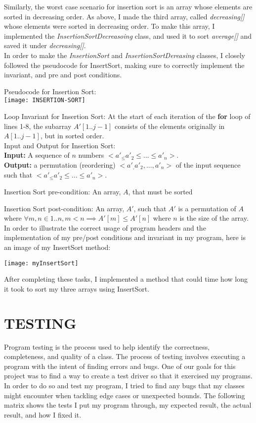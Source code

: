 \documentclass[12pt]{article}
\begin{document}
Similarly, the worst case scenario for insertion sort is an array whose elements are sorted in decreasing order. As above, I made the third array, called \textit{decreasing[]} whose elements were sorted in decreasing order. To make this array, I implemented the \textit{InsertionSortDecreasoing} class, and used it to sort \textit{average[]} and saved it under \textit{decreasing[]}.\\

In order to make the \textit{InsertionSort} and \textit{InsertionSortDereasing} classes, I closely followed the pseudocode for InsertSort, making sure to correctly implement the invariant, and pre and post conditions.

\vspace*{.2in}
Pseudocode for Insertion Sort: \\
\vspace*{.5in}
\texttt{[image: INSERTION-SORT]}

Loop Invariant for Insertion Sort: At the start of each iteration of the \textbf{for} loop of lines 1-8, the subarray $A'[1 .. j-1]$ consists of the elements originally in $A[1 .. j-1]$, but in  sorted order.\\

Input and Output for Insertion Sort:\\ \textbf{Input: } A sequence of $n$ numbers $<a'_ \le a'_2 \le ... \le a'_n>$. \\
\textbf{Output: } a permutation (reordering) $<a'_, a'_2, ... , a'_n>$ of the input sequence such that $<a'_ \le a'_2 \le ... \le a'_n>$.

Insertion Sort pre-condition: An array, $A$, that must be sorted

Insertion Sort post-condition: An array, $A'$, such that $A'$ is a permutation of $A$ where $\forall m, n \in {1..n}, m < n \implies A'[m] \le A'[n]$ where $n$ is the size of the array.\\

In order to illustrate the correct usage of program headers and the implementation of my pre/post conditions and invariant in my program, here is an image of my InsertSort method: 

\texttt{[image: myInsertSort]}

After completing these tasks, I implemented a method that could time how long it took to sort my three arrays using InsertSort. 



\section*{TESTING}
Program testing is the process used to help identify the correctness, completeness, and quality of a class. The process of testing involves executing a program with the intent of finding errors and bugs. One of our goals for this project was to find a way to create a test driver so that it exercised my programs. In order to do so and test my program, I tried to find any bugs that my classes might encounter when tackling edge cases or unexpected bounds. The following matrix shows the tests I put my program through, my expected result, the actual result, and how I fixed it. 
\end{document}
